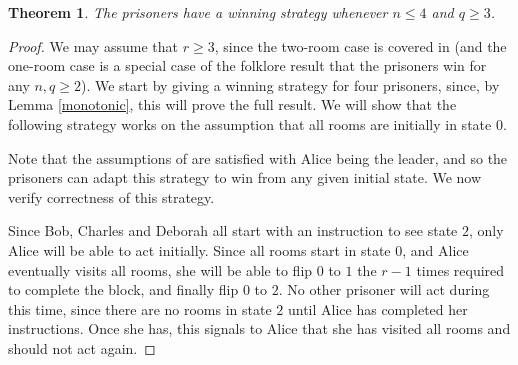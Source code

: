 \documentclass[a4paper,11pt]{extarticle}
\newtheorem{theorem}{Theorem}
\theoremstyle{definition}
\theoremstyle{remark}
\begin{document}
	\begin{theorem}\label{three-four}The prisoners have a winning strategy whenever $n\leq 4$ and $q\geq 3$.
	\end{theorem}
	\begin{proof}
		We may assume that $r\geq 3$, since the two-room case is covered in \cite{KK21} (and the one-room case is a special case of the folklore result that the prisoners win for any $n,q\geq 2$). We start by giving a winning strategy for four prisoners, since, by Lemma \ref{monotonic}, this will prove the full result. We will show that the following strategy works on the assumption that all rooms are initially in state $0$. 
		
		\medskip
		\begin{algorithm}[H]
			\caption{Alice's Protocol}
			\;
		\end{algorithm}
		
		\begin{algorithm}[H]
			\caption{Bob's Protocol}
			\;
		\end{algorithm}
		
		\begin{algorithm}[H]
			\caption{Charles' Protocol}
			\;
			\;
			\;
		\end{algorithm}
		
		\begin{algorithm}[H]
			\caption{Deborah's Protocol}
			\;
			\;
			\;
			\dec
		\end{algorithm}
		
		Note that the assumptions of \cite[Lemma 4]{KK21} are satisfied with Alice being the leader, and so the prisoners can adapt this strategy to win from any given initial state. We now verify correctness of this strategy.
		
		Since Bob, Charles and Deborah all start with an instruction to see state $2$, only Alice will be able to act initially. Since all rooms start in state $0$, and Alice eventually visits all rooms, she will be able to flip $0$ to $1$ the $r-1$ times required to complete the \rpttext block, and finally flip $0$ to $2$. No other prisoner will act during this time, since there are no rooms in state $2$ until Alice has completed her instructions. Once she has, this signals to Alice that she has visited all rooms and should not act again.
		

\end{proof}
\end{document}
